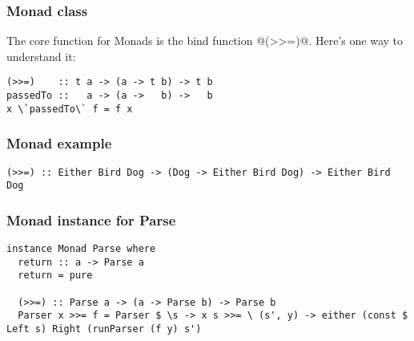 \documentclass{beamer}
\begin{document}
\begin{frame}

\frametitle{Monad class}
The core function for Monads is the bind function @(>>=)@. Here's one way to understand it:

\begin{lstlisting}
(>>=)    :: t a -> (a -> t b) -> t b
passedTo ::   a -> (a ->   b) ->   b
x \`passedTo\` f = f x
\end{lstlisting}


\end{frame}



\begin{frame}
\frametitle{Monad example}

\begin{lstlisting}[frame=single]
(>>=) :: Either Bird Dog -> (Dog -> Either Bird Dog) -> Either Bird Dog
\end{lstlisting}

%
%
%
%

\end{frame}


\begin{frame}
\frametitle{Monad instance for Parse}


\begin{lstlisting}[frame=single]
instance Monad Parse where
  return :: a -> Parse a
  return = pure

  (>>=) :: Parse a -> (a -> Parse b) -> Parse b
  Parser x >>= f = Parser $ \s -> x s >>= \ (s', y) -> either (const $ Left s) Right (runParser (f y) s')
\end{lstlisting}

\end{frame}
\end{document}
